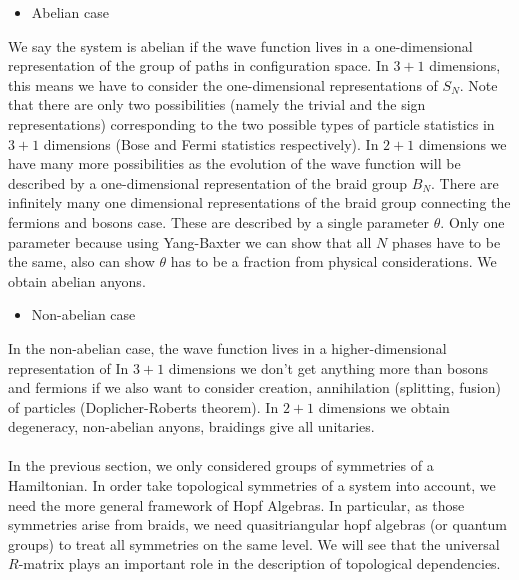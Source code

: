 \documentclass{article}
\begin{document}
\begin{itemize}
	\item Abelian case
\end{itemize}
We say the system is abelian if the wave function lives in a one-dimensional representation of the group of paths in configuration space. In $3+1$ dimensions, this means we have to consider the one-dimensional representations of $S_N$. Note that there are only two possibilities (namely the trivial and the sign representations) corresponding to the two possible types of particle statistics in $3+1$ dimensions (Bose and Fermi statistics respectively).
In $2+1$ dimensions we have many more possibilities as the evolution of the wave function will be described by a one-dimensional representation of the braid group $B_N$. There are infinitely many one dimensional representations of the braid group connecting the fermions and bosons case. These are described by a single parameter $\theta$. Only one parameter because using Yang-Baxter we can show that all $N$ phases have to be the same, also can show $\theta$ has to be a fraction from physical considerations. We obtain abelian anyons.\\
\begin{itemize}
	\item Non-abelian case
\end{itemize}
In the non-abelian case, the wave function lives in a higher-dimensional representation of In $3+1$ dimensions we don't get anything more than bosons and fermions if we also want to consider creation, annihilation (splitting, fusion) of particles (Doplicher-Roberts theorem). 
In $2+1$ dimensions we obtain degeneracy, non-abelian anyons, braidings give all unitaries.\\~\\
In the previous section, we only considered groups of symmetries of a Hamiltonian. In order take topological symmetries of a system into account, we need the more general framework of Hopf Algebras. In particular, as those symmetries arise from braids, we need quasitriangular hopf algebras (or quantum groups) to treat all symmetries on the same level. We will see that the universal $R$-matrix plays an important role in the description of topological dependencies.
\end{document}
